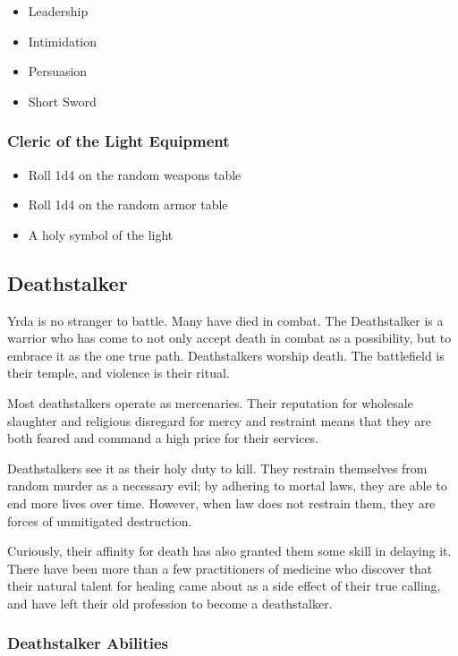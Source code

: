 \begin{multicols}{2}
\begin{itemize}
  \item Leadership
  \item Intimidation
  \item Persuasion
  \item Short Sword
\end{itemize}

\subsubsection{Cleric of the Light Equipment}

\begin{itemize}
  \item Roll 1d4 on the random weapons table
  \item Roll 1d4 on the random armor table
  \item A holy symbol of the light
\end{itemize}

\subsection{Deathstalker}

Yrda is no stranger to battle. Many have died in combat. The Deathstalker
is a warrior who has come to not only accept death in combat as a possibility,
but to embrace it as the one true path. Deathstalkers worship death. The
battlefield is their temple, and violence is their ritual.

Most deathstalkers operate as mercenaries. Their reputation for wholesale
slaughter and religious disregard for mercy and restraint means that they
are both feared and command a high price for their services.

Deathstalkers see it as their holy duty to kill. They restrain themselves
from random murder as a necessary evil; by adhering to mortal laws, they
are able to end more lives over time. However, when law does not restrain
them, they are forces of unmitigated destruction.

Curiously, their affinity for death has also granted them some skill in
delaying it. There have been more than a few practitioners of medicine
who discover that their natural talent for healing came about as a side
effect of their true calling, and have left their old profession to become
a deathstalker.

\subsubsection{Deathstalker Abilities}


\end{multicols}
